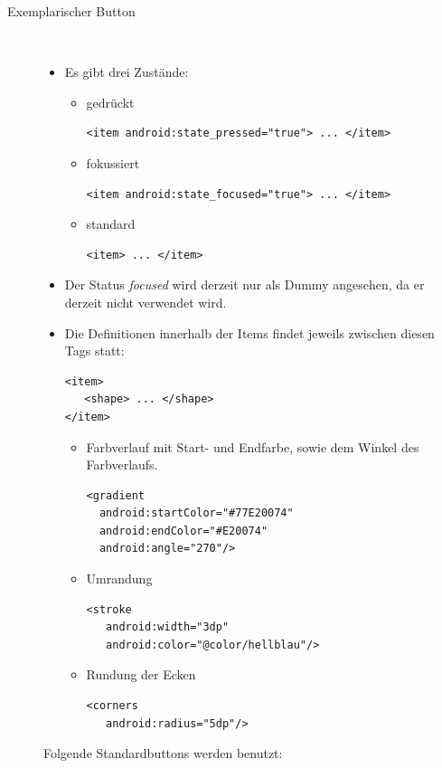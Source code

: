 \begin{description}
\item[Exemplarischer Button]~\par
\begin{itemize}
\item Es gibt drei Zustände:
\begin{itemize}
\item gedrückt
\begin{lstlisting}
<item android:state_pressed="true"> ... </item>
\end{lstlisting}
\item fokussiert
\begin{lstlisting}
<item android:state_focused="true"> ... </item>
\end{lstlisting}
\item standard
\begin{lstlisting}
<item> ... </item>
\end{lstlisting}
\end{itemize}
\item Der Status \textit{focused} wird derzeit nur als Dummy angesehen, da er derzeit nicht verwendet wird.
\item Die Definitionen innerhalb der Items findet jeweils zwischen diesen Tags statt:
\begin{lstlisting}
<item>
   <shape> ... </shape>
</item>
\end{lstlisting}
\begin{itemize}
\item Farbverlauf mit Start- und Endfarbe, sowie dem Winkel des Farbverlaufs.
\begin{lstlisting}
<gradient
  android:startColor="#77E20074" 
  android:endColor="#E20074"     
  android:angle="270"/>           
\end{lstlisting}
\item Umrandung
\begin{lstlisting}
<stroke
   android:width="3dp"
   android:color="@color/hellblau"/>
\end{lstlisting}
\item Rundung der Ecken
\begin{lstlisting}
<corners
   android:radius="5dp"/>
\end{lstlisting}
\end{itemize}
\end{itemize}

Folgende Standardbuttons werden benutzt:


\end{description}
